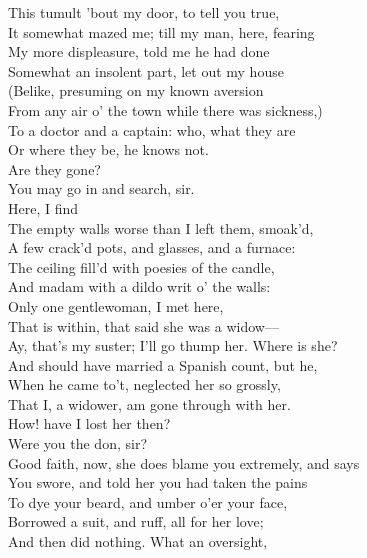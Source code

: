 \documentclass[a4paper,oneside]{memoir}
\begin{document}
\begin{drama*}
This tumult 'bout my door, to tell you true,\\
It somewhat mazed me; till my man, here, fearing\\
My more displeasure, told me he had done\\
Somewhat an insolent part, let out my house\\
(Belike, presuming on my known aversion\\
From any air o' the town while there was sickness,)\\
To a doctor and a captain: who, what they are\\
Or where they be, he knows not.\\
\mammonspeaks {} Are they gone?\\
\lovewitspeaks You may go in and search, sir.\\
 Here, I find\\
The empty walls worse than I left them, smoak'd,\\
A few crack'd pots, and glasses, and a furnace:\\
The ceiling fill'd with poesies of the candle,\\
And madam with a dildo writ o' the walls:\\
Only one gentlewoman, I met here,\\
That is within, that said she was a widow---\\
\kastrilspeaks Ay, that's my suster; I'll go thump her. Where is she?\\
\lovewitspeaks And should have married a Spanish count, but he,\\
When he came to't, neglected her so grossly,\\
That I, a widower, am gone through with her.\\
\surlyspeaks How! have I lost her then?\\
\lovewitspeaks {} Were you the don, sir?\\
Good faith, now, she does blame you extremely, and says\\
You swore, and told her you had taken the pains\\
To dye your beard, and umber o'er your face,\\
Borrowed a suit, and ruff, all for her love;\\
And then did nothing. What an oversight,\\

\end{drama*}
\end{document}
